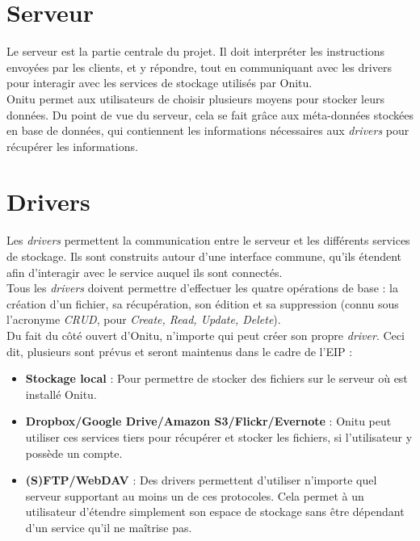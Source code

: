 \section{Serveur}
Le serveur est la partie centrale du projet. Il doit interpréter les instructions envoyées par les clients, et y répondre, tout en communiquant avec les drivers pour interagir avec les services de stockage utilisés par Onitu.\\

Onitu permet aux utilisateurs de choisir plusieurs moyens pour stocker leurs données. Du point de vue du serveur, cela se fait grâce aux méta-données stockées en base de données, qui contiennent les informations nécessaires aux \textit{drivers} pour récupérer les informations.\\

\section{Drivers}
Les \textit{drivers} permettent la communication entre le serveur et les différents services de stockage. Ils sont construits autour d'une interface commune, qu'ils étendent afin d'interagir avec le service auquel ils sont connectés.\\

Tous les \textit{drivers} doivent permettre d'effectuer les quatre opérations de base : la création d'un fichier, sa récupération, son édition et sa suppression (connu sous l'acronyme \textit{CRUD}, pour \textit{Create, Read, Update, Delete}).\\

Du fait du côté ouvert d'Onitu, n'importe qui peut créer son propre \textit{driver}. Ceci dit, plusieurs sont prévus et seront maintenus dans le cadre de l'EIP :
\begin{itemize}
\renewcommand{\labelitemi}{$\bullet$}
    \item \textbf{Stockage local} : Pour permettre de stocker des fichiers sur le serveur où est installé Onitu.
    \item \textbf{Dropbox/Google Drive/Amazon S3/Flickr/Evernote} : Onitu peut utiliser ces services tiers pour récupérer et stocker les fichiers, si l'utilisateur y possède un compte.
    \item \textbf{(S)FTP/WebDAV} : Des drivers permettent d'utiliser n'importe quel serveur supportant au moins un de ces protocoles. Cela permet à un utilisateur d'étendre simplement son espace de stockage sans être dépendant d'un service qu'il ne maîtrise pas.
\end{itemize}

